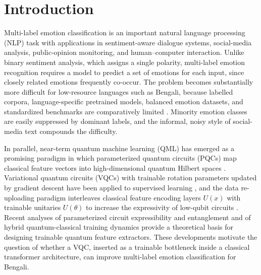 \documentclass[runningheads]{llncs}
\begin{document}
\section{Introduction}\label{sec:intro}
Multi-label emotion classification is an important natural language processing (NLP) task with applications in sentiment-aware dialogue systems, social-media analysis, public-opinion monitoring, and human--computer interaction. Unlike binary sentiment analysis, which assigns a single polarity, multi-label emotion recognition requires a model to predict a set of emotions for each input, since closely related emotions frequently co-occur. The problem becomes substantially more difficult for low-resource languages such as Bengali, because labelled corpora, language-specific pretrained models, balanced emotion datasets, and standardized benchmarks are comparatively limited \cite{bhattacharjee2022banglabert,islam2022emonoba}. Minority emotion classes are easily suppressed by dominant labels, and the informal, noisy style of social-media text compounds the difficulty.

In parallel, near-term quantum machine learning (QML) has emerged as a promising paradigm in which parameterized quantum circuits (PQCs) map classical feature vectors into high-dimensional quantum Hilbert spaces \cite{huzzat2026primer}. Variational quantum circuits (VQCs) with trainable rotation parameters updated by gradient descent have been applied to supervised learning \cite{schuld2020circuit}, and the data re-uploading paradigm interleaves classical feature encoding layers $U(x)$ with trainable unitaries $U(\theta)$ to increase the expressivity of low-qubit circuits \cite{perez2020data}. Recent analyses of parameterized circuit expressibility and entanglement \cite{sim2019expressibility} and of hybrid quantum-classical training dynamics \cite{arthur2022hybrid} provide a theoretical basis for designing trainable quantum feature extractors. These developments motivate the question of whether a VQC, inserted as a trainable bottleneck inside a classical transformer architecture, can improve multi-label emotion classification for Bengali.
\end{document}
